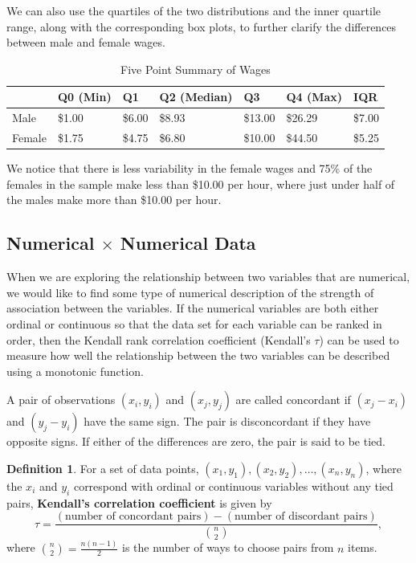 \documentclass[
]{book}
\theoremstyle{definition}
\newtheorem{definition}{Definition}[chapter]
\theoremstyle{definition}
\theoremstyle{definition}
\theoremstyle{definition}
\theoremstyle{remark}
\begin{document}
We can also use the quartiles of the two distributions and the inner quartile range, along with the corresponding box plots, to further clarify the differences between male and female wages.

\begin{table}

\caption{\label{tab:unnamed-chunk-193}Five Point Summary of Wages}
\centering
\begin{tabular}[t]{lllllll}
\toprule
  & Q0 (Min) & Q1 & Q2 (Median) & Q3 & Q4 (Max) & IQR\\
\midrule
Male & \$1.00 & \$6.00 & \$8.93 & \$13.00 & \$26.29 & \$7.00\\
Female & \$1.75 & \$4.75 & \$6.80 & \$10.00 & \$44.50 & \$5.25\\
\bottomrule
\end{tabular}
\end{table}

We notice that there is less variability in the female wages and 75\% of the females in the sample make less than \$10.00 per hour, where just under half of the males make more than \$10.00 per hour.

\hypertarget{numerical-times-numerical-data}{%
\subsection{\texorpdfstring{Numerical \(\times\) Numerical Data}{Numerical \textbackslash times Numerical Data}}\label{numerical-times-numerical-data}}

When we are exploring the relationship between two variables that are numerical, we would like to find some type of numerical description of the strength of association between the variables. If the numerical variables are both either ordinal or continuous so that the data set for each variable can be ranked in order, then the Kendall rank correlation coefficient (Kendall's \(\tau\)) can be used to measure how well the relationship between the two variables can be described using a monotonic function.

A pair of observations \((x_i,y_i)\) and \((x_j,y_j)\) are called concordant if \((x_j-x_i)\) and \((y_j-y_i)\) have the same sign. The pair is disconcordant if they have opposite signs. If either of the differences are zero, the pair is said to be tied.

\begin{definition}
For a set of data points, \((x_1, y_1), (x_2, y_2), \ldots, (x_n,y_n)\), where the \(x_i\) and \(y_i\) correspond with ordinal or continuous variables without any tied pairs, \textbf{Kendall's correlation coefficient} is given by
\[\tau = \frac{(\mbox{number of concordant pairs})- (\mbox{number of discordant pairs})}{\binom{n}{2}},\]
where \(\binom{n}{2}=\frac{n(n-1)}{2}\) is the number of ways to choose pairs from \(n\) items.
\end{definition}
\end{document}
